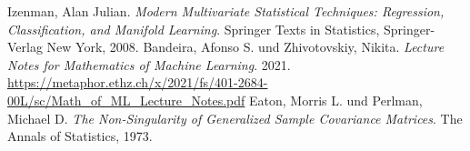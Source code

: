 \documentclass[]{article}
\begin{document}
\newpage

\begin{thebibliography}{9}
	Izenman, Alan Julian.
	\textit{Modern Multivariate Statistical Techniques: Regression, Classification, and Manifold Learning}. 
	Springer Texts in Statistics, Springer-Verlag New York, 2008.
	Bandeira, Afonso S. und Zhivotovskiy, Nikita.
	\textit{Lecture Notes for Mathematics of Machine Learning}. 2021.
	\url{https://metaphor.ethz.ch/x/2021/fs/401-2684-00L/sc/Math_of_ML_Lecture_Notes.pdf}
	Eaton, Morris L. und Perlman, Michael D.
	\textit{The Non-Singularity of Generalized Sample Covariance Matrices}.
	The Annals of Statistics, 1973.
\end{thebibliography}
\end{document}

